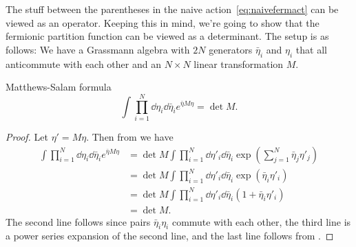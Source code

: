 The stuff between the parentheses in the naive action~\eqref{eq:naivefermact}
can be viewed as an operator. Keeping this in mind, we're going to show
that the fermionic partition function can be viewed as a determinant.
The setup is as follows: We have a Grassmann algebra with $2N$ generators
$\bar{\eta}_i$ and $\eta_i$ that all anticommute with each other and
an $N\times N$ linear transformation $M$.
\begin{theorem}{Matthews-Salam formula}{}
$$
  \int\prod_{i=1}^N\dd{\eta_i}\dd{\bar{\eta}_i}e^{\bar{\eta}M\eta}=\det M.
$$
\begin{proof} Let $\eta'=M\eta$. Then from 
  we have
  \begin{equation*}\begin{aligned}
  \int \prod_{i=1}^N\dd{\eta_i}\dd{\bar{\eta}_i}e^{\bar{\eta}M\eta}
    &=\det M\int \prod_{i=1}^N\dd{\eta'_i}\dd{\bar{\eta}_i}
       \exp\left(\sum_{j=1}^N\bar{\eta}_j\eta'_j\right)\\
    &=\det M\int \prod_{i=1}^N\dd{\eta'_i}\dd{\bar{\eta}_i}
       \exp\left(\bar{\eta}_i\eta'_i\right)\\
    &=\det M\int \prod_{i=1}^N\dd{\eta'_i}\dd{\bar{\eta}_i}
        (1+\bar{\eta}_i\eta'_i)\\
    &=\det M.
  \end{aligned}\end{equation*}
  The second line follows since pairs $\bar{\eta}_i\eta_i$ commute with
  each other, the third line is a power series expansion of the second
  line, and the last line follows from .
\end{proof}
\end{theorem}

